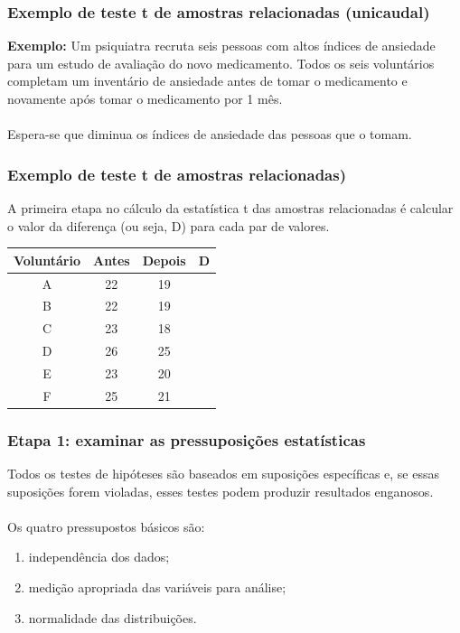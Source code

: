 \documentclass[11pt]{beamer}
\begin{document}
\begin{frame}
\frametitle{Exemplo de teste t de amostras relacionadas (unicaudal)}
\textbf{Exemplo:} Um psiquiatra recruta seis pessoas com altos índices de ansiedade para um estudo de avaliação do novo medicamento. Todos os seis voluntários completam um inventário de ansiedade antes de tomar o medicamento e novamente após tomar o medicamento por 1 mês.\\~\\ 

Espera-se que diminua os índices de ansiedade das pessoas que o tomam.
\end{frame}

\begin{frame}
\frametitle{Exemplo de teste t de amostras relacionadas)}

A primeira etapa no cálculo da estatística t das amostras relacionadas é calcular o valor da diferença (ou seja, D) para cada par de valores. 

\begin{center}
\begin{tabular}{cccc} 
 \hline
Voluntário & Antes & Depois & D \\
 \hline
A & 22 & 19 & \\
B & 22 & 19 & \\
C & 23 & 18 & \\
D & 26 & 25 & \\
E & 23 & 20 & \\
F & 25 & 21 & \\
 \hline
\end{tabular}
\end{center}   

\end{frame}

\begin{frame}
\frametitle{Etapa 1: examinar as pressuposições estatísticas}

Todos os testes de hipóteses são baseados em suposições específicas e, se essas suposições forem violadas, esses testes podem produzir resultados enganosos.\\~\\
Os quatro pressupostos básicos são:

\begin{enumerate}
\item independência dos dados;
\item medição apropriada das variáveis para análise;
\item normalidade das distribuições.
\end{enumerate}

\end{frame}
\end{document}
